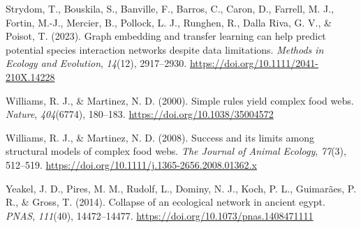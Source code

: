 \documentclass[
]{article}
\newlength{\cslhangindent}
\newenvironment{CSLReferences}[2] %
 {\begin{list}{}{%
  \setlength{\itemindent}{0pt}
  \setlength{\leftmargin}{0pt}
  \setlength{\parsep}{0pt}
  \ifodd #1
   \setlength{\leftmargin}{\cslhangindent}
   \setlength{\itemindent}{-1\cslhangindent}
  \fi
  \setlength{\itemsep}{#2\baselineskip}}}
 {\end{list}}
\begin{document}
\begin{CSLReferences}{1}{0}
Strydom, T., Bouskila, S., Banville, F., Barros, C., Caron, D., Farrell,
M. J., Fortin, M.-J., Mercier, B., Pollock, L. J., Runghen, R., Dalla
Riva, G. V., \& Poisot, T. (2023). Graph embedding and transfer learning
can help predict potential species interaction networks despite data
limitations. \emph{Methods in Ecology and Evolution}, \emph{14}(12),
2917--2930. \url{https://doi.org/10.1111/2041-210X.14228}

Williams, R. J., \& Martinez, N. D. (2000). Simple rules yield complex
food webs. \emph{Nature}, \emph{404}(6774), 180--183.
\url{https://doi.org/10.1038/35004572}

Williams, R. J., \& Martinez, N. D. (2008). Success and its limits among
structural models of complex food webs. \emph{The Journal of Animal
Ecology}, \emph{77}(3), 512--519.
\url{https://doi.org/10.1111/j.1365-2656.2008.01362.x}

Yeakel, J. D., Pires, M. M., Rudolf, L., Dominy, N. J., Koch, P. L.,
Guimarães, P. R., \& Gross, T. (2014). Collapse of an ecological network
in ancient egypt. \emph{PNAS}, \emph{111}(40), 14472--14477.
\url{https://doi.org/10.1073/pnas.1408471111}

\end{CSLReferences}
\end{document}
